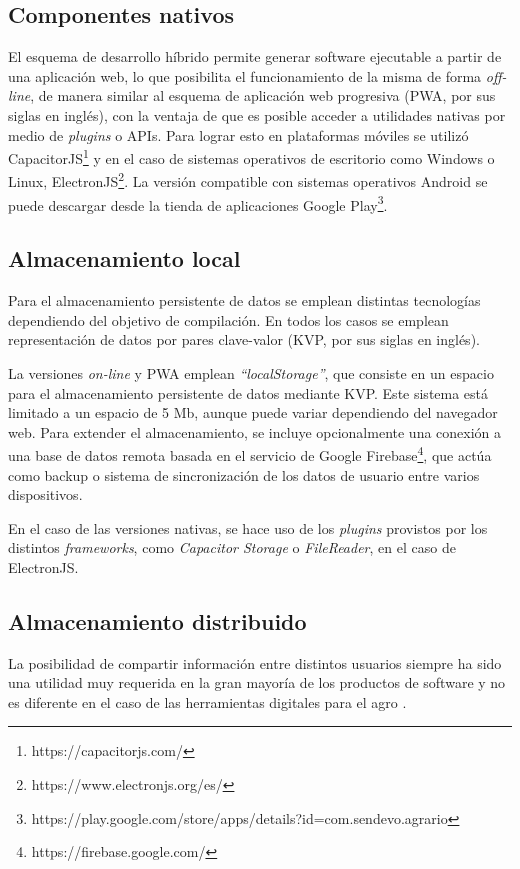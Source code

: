 \subsection{Componentes nativos} \label{sec:nativo}
El esquema de desarrollo híbrido permite generar software ejecutable a partir de una aplicación web, lo que posibilita el funcionamiento de la misma de forma \textit{off-line}, de manera similar al esquema de aplicación web progresiva (PWA, por sus siglas en inglés), con la ventaja de que es posible acceder a utilidades nativas por medio de \textit{plugins} o APIs. Para lograr esto en plataformas móviles se utilizó CapacitorJS\footnote{https://capacitorjs.com/} y en el caso de sistemas operativos de escritorio como Windows o Linux, ElectronJS\footnote{https://www.electronjs.org/es/}. La versión compatible con sistemas operativos Android se puede descargar desde la tienda de aplicaciones Google Play\footnote{https://play.google.com/store/apps/details?id=com.sendevo.agrario}.

\subsection{Almacenamiento local}
Para el almacenamiento persistente de datos se emplean distintas tecnologías dependiendo del objetivo de compilación. En todos los casos se emplean representación de datos por pares clave-valor (KVP, por sus siglas en inglés).

La versiones \textit{on-line} y PWA emplean \textit{``localStorage''}, que consiste en un espacio para el almacenamiento persistente de datos mediante KVP. Este sistema está limitado a un espacio de 5 Mb, aunque puede variar dependiendo del navegador web. Para extender el almacenamiento, se incluye opcionalmente una conexión a una base de datos remota basada en el servicio de Google Firebase\footnote{https://firebase.google.com/}, que actúa como backup o sistema de sincronización de los datos de usuario entre varios dispositivos.

En el caso de las versiones nativas, se hace uso de los \textit{plugins} provistos por los distintos \textit{frameworks}, como \textit{Capacitor Storage} o \textit{FileReader}, en el caso de ElectronJS. 

\subsection{Almacenamiento distribuido} \label{sec:comunicacion}
La posibilidad de compartir información entre distintos usuarios siempre ha sido una utilidad muy requerida en la gran mayoría de los productos de software y no es diferente en el caso de las herramientas digitales para el agro \cite{davis1989,venkatesh2003,briggerman2010,michels2020}. 

